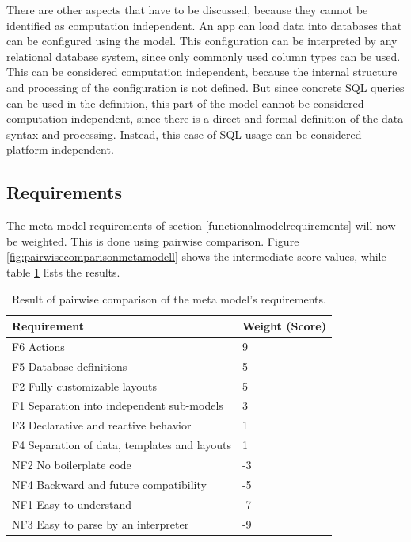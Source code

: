 There are other aspects that have to be discussed, because they cannot be identified as computation independent.
An app can load data into databases that can be configured using the model.
This configuration can be interpreted by any relational database system, since only commonly used column types can be used.
This can be considered computation independent, because the internal structure and processing of the configuration is not defined.
But since concrete \ac{SQL} queries can be used in the definition, this part of the model cannot be considered computation independent, since there is a direct and formal definition of the data syntax and processing.
Instead, this case of \ac{SQL} usage can be considered platform independent.



\subsection{Requirements}

The meta model requirements of section \ref{functionalmodelrequirements} will now be weighted.
This is done using pairwise comparison.
Figure \ref{fig:pairwisecomparisonmetamodell} shows the intermediate score values, while table \ref{table:pairwisecomparisonmetamodelresult} lists the results.

\begin{table}[h]
	\begin{center}
		\begin{tabular}{l|l}
			Requirement                               & Weight (Score) \\ \hline
			F6 Actions                                   & 9     \\
			F5 Database definitions                      & 5     \\
			F2 Fully customizable layouts                & 5     \\
			F1 Separation into independent sub-models    & 3     \\
			F3 Declarative and reactive behavior         & 1     \\
			F4 Separation of data, templates and layouts & 1     \\
			NF2 No boilerplate code                       & -3    \\
			NF4 Backward and future compatibility         & -5    \\
			NF1 Easy to understand                        & -7    \\
			NF3 Easy to parse by an interpreter           & -9   
			\\ \hline
		\end{tabular}
	\end{center}
	\caption{Result of pairwise comparison of the meta model's requirements.}
	\label{table:pairwisecomparisonmetamodelresult}
\end{table}

